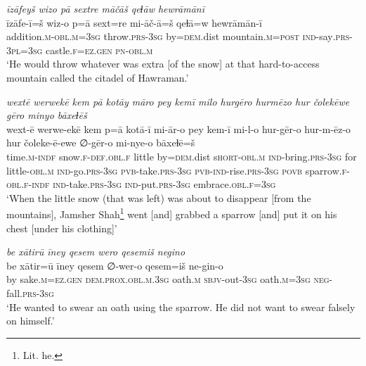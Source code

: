 \ea \label{DP.35}
\textit{īzāfeyš wizo pā sextre māčāš qeɫāw hewrāmānī} \\ 
\gll īzāfe-ī=š wiz-o p=ā sext=re mi-āč-ā=š qeɫā=w hewrāmān-ī \\ 
 addition\textsc{.m}\textsc{-obl}\textsc{.m}\textsc{=3sg} throw\textsc{.prs}\textsc{-3sg} by\textsc{=dem}.dist mountain\textsc{.m}\textsc{=\textsc{post}} \textsc{ind-}say\textsc{.prs}\textsc{-3pl}\textsc{=3sg} castle\textsc{\textsc{.f}}\textsc{=ez}\textsc{.gen} \textsc{pn}\textsc{-obl}\textsc{.m} \\ 
\glt `He would throw whatever was extra [of the snow] at that hard-to-access mountain called the citadel of Hawraman.'
\z 
 
\ea \label{DP.36}
\textit{wextē werwekē kem pā kotāy māro pey kemī milo hurgēro hurmēzo hur čolekēwe gēro minyo bāxeɫēš} \\ 
\gll wext-ē werwe-ekē kem p=ā kotā-ī mi-ār-o pey kem-ī mi-l-o hur-gēr-o hur-m-ēz-o hur čoleke-ē-ewe ∅-gēr-o mi-nye-o bāxeɫē=š \\ 
 time\textsc{.m}\textsc{-indf} snow\textsc{\textsc{.f}}\textsc{-def}\textsc{.obl}\textsc{\textsc{.f}} little by\textsc{=dem}.dist s\textsc{hort}\textsc{-obl}\textsc{.m} \textsc{ind-}bring\textsc{.prs}\textsc{-3sg} for little\textsc{-obl}\textsc{.m} \textsc{ind-}go\textsc{.prs}\textsc{-3sg} \textsc{pvb-}take\textsc{.prs}\textsc{-3sg} \textsc{pvb-}\textsc{ind-}rise\textsc{.prs}\textsc{-3sg} \textsc{povb} sparrow\textsc{\textsc{.f}}\textsc{-obl}\textsc{\textsc{.f}}\textsc{-indf} \textsc{ind-}take\textsc{.prs}\textsc{-3sg} \textsc{ind-}put\textsc{.prs}\textsc{-3sg} embrace\textsc{.obl}\textsc{\textsc{.f}}\textsc{=3sg} \\ 
\glt `When the little snow (that was left) was about to disappear [from the mountains], Jamsher Shah\footnote{Lit. he.} went [and] grabbed a sparrow [and] put it on his chest [under his clothing]'
\z 
 
\ea \label{DP.37}
\textit{be xātirū īney qesem wero qesemiš negino} \\ 
\gll be xātir=ū īney qesem ∅-wer-o qesem=iš ne-gin-o \\ 
 by sake\textsc{.m}\textsc{=ez}\textsc{.gen} \textsc{dem.prox}\textsc{.obl}\textsc{.m}\textsc{.3sg} oath\textsc{.m} \textsc{sbjv-}out\textsc{-3sg} oath\textsc{.m}\textsc{=3sg} \textsc{neg-}fall\textsc{.prs}\textsc{-3sg} \\ 
\glt `He wanted to swear an oath using the sparrow. He did not want to swear falsely on himself.'
\z 
 

